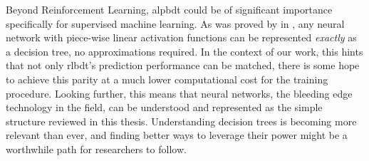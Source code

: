 Beyond Reinforcement Learning, \ac{alpbdt} could be of significant importance
specifically for supervised machine learning. As was proved by
\citeauthor{caglar22} in \cite{caglar22}, any neural network with piece-wise
linear activation functions can be represented \emph{exactly} as a decision
tree, no approximations required. In the context of our work, this hints that
not only \ac{rlbdt}'s prediction performance \cite{xiong} can be matched, there
is some hope to achieve this parity at a much lower computational cost for the
training procedure. Looking further, this means that neural networks, the
bleeding edge technology in the field, can be understood and represented as the
simple structure reviewed in this thesis. Understanding decision trees is
becoming more relevant than ever, and finding better ways to leverage their
power might be a worthwhile path for researchers to follow.